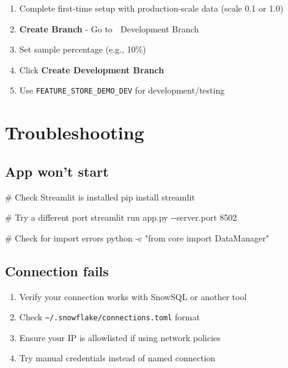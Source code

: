 \documentclass[
  letterpaper,
  DIV=11,
  numbers=noendperiod]{scrreprt}
\newenvironment{Shaded}{\begin{snugshade}}{\end{snugshade}}
\newcommand{\AttributeTok}[1]{\textcolor[rgb]{0.40,0.45,0.13}{#1}}
\newcommand{\CommentTok}[1]{\textcolor[rgb]{0.37,0.37,0.37}{#1}}
\newcommand{\ExtensionTok}[1]{\textcolor[rgb]{0.00,0.23,0.31}{#1}}
\newcommand{\NormalTok}[1]{\textcolor[rgb]{0.00,0.23,0.31}{#1}}
\newcommand{\StringTok}[1]{\textcolor[rgb]{0.13,0.47,0.30}{#1}}
\providecommand{\tightlist}{%
  \setlength{\itemsep}{0pt}\setlength{\parskip}{0pt}}\usepackage{longtable,booktabs,array}
\begin{document}
\begin{enumerate}
\def\labelenumi{\arabic{enumi}.}
\tightlist
\item
  Complete first-time setup with production-scale data (scale 0.1 or
  1.0)
\item
  \textbf{Create Branch} - Go to 🌿 Development Branch
\item
  Set sample percentage (e.g., 10\%)
\item
  Click \textbf{Create Development Branch}
\item
  Use \texttt{FEATURE\_STORE\_DEMO\_DEV} for development/testing
\end{enumerate}

\hypertarget{troubleshooting}{%
\section{Troubleshooting}\label{troubleshooting}}

\hypertarget{app-wont-start}{%
\subsection{App won't start}\label{app-wont-start}}

\begin{Shaded}
\begin{Highlighting}[]
\CommentTok{\# Check Streamlit is installed}
\ExtensionTok{pip}\NormalTok{ install streamlit}

\CommentTok{\# Try a different port}
\ExtensionTok{streamlit}\NormalTok{ run app.py }\AttributeTok{{-}{-}server.port}\NormalTok{ 8502}

\CommentTok{\# Check for import errors}
\ExtensionTok{python} \AttributeTok{{-}c} \StringTok{"from core import DataManager"}
\end{Highlighting}
\end{Shaded}

\hypertarget{connection-fails}{%
\subsection{Connection fails}\label{connection-fails}}

\begin{enumerate}
\def\labelenumi{\arabic{enumi}.}
\tightlist
\item
  Verify your connection works with SnowSQL or another tool
\item
  Check \texttt{\textasciitilde{}/.snowflake/connections.toml} format
\item
  Ensure your IP is allowlisted if using network policies
\item
  Try manual credentials instead of named connection
\end{enumerate}
\end{document}
